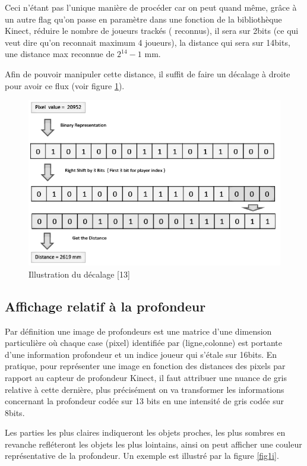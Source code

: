 \documentclass[12pt,a4paper,oneside]{book}
\begin{document}
	Ceci n'étant pas l'unique manière de procéder car on peut quand même, grâce à un autre flag qu'on passe en paramètre dans une fonction de la bibliothèque Kinect, réduire le nombre de joueurs trackés ( reconnus), il sera sur 2bits (ce qui veut dire qu'on reconnait maximum 4 joueurs), la distance qui sera sur 14bits, une distance max reconnue de $2^{14}-1$ mm.
	
	Afin de pouvoir manipuler cette distance, il suffit de faire un décalage à droite pour avoir ce flux (voir figure \ref{fig1d}).
	
	\begin{figure}[H]
		\centering
		\includegraphics[scale=0.6]{images/screenshot001.png}
		\caption{Illustration du décalage \textcolor[rgb]{1.00,0.00,0.00}{[13]}}
		\label{fig1d}
	\end{figure}
	
	\subsection{Affichage relatif à la profondeur}
	
	Par définition une image de profondeurs est une matrice d'une dimension particulière où chaque case (pixel) identifiée par (ligne,colonne) est portante  d'une information profondeur et un indice joueur qui s'étale sur 16bits.
	En pratique, pour représenter une image en fonction des distances des pixels par rapport au capteur de profondeur Kinect, il faut attribuer une nuance de gris relative à cette dernière, plus précisément on va transformer les informations concernant la profondeur codée sur 13 bits en une intensité de gris codée sur 8bits.
	
	Les parties les plus claires indiqueront les objets proches, les plus sombres en revanche refléteront les objets les plus lointains, ainsi on peut afficher une couleur représentative de la profondeur. Un exemple est illustré par la figure \ref{fig1i}.
	
\end{document}
